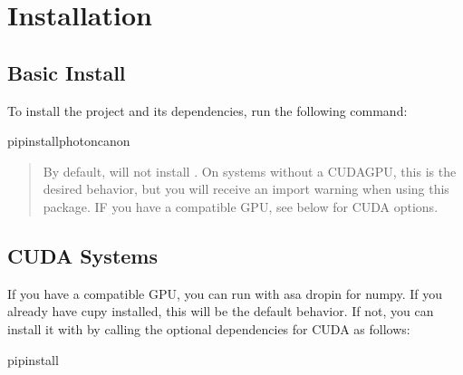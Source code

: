 \documentclass[letterpaper,10pt,english]{sphinxmanual}
\begin{document}
\section{Installation}
\label{\detokenize{README:installation}}

\subsection{Basic Install}
\label{\detokenize{README:basic-install}}
\sphinxAtStartPar
To install the project and its dependencies, run the following command:

\begin{sphinxVerbatim}[commandchars=\\\{\}]
pipinstallphoton\PYGZhy{}canon
\end{sphinxVerbatim}
\begin{quote}

\sphinxAtStartPar
{} By default,  will not install . On systems without a CUDA\sphinxhyphen{}GPU, this is the desired behavior,
but you will receive an import warning when using this package. IF you have a compatible GPU, see below for CUDA
options.
\end{quote}


\subsection{CUDA Systems}
\label{\detokenize{README:cuda-systems}}
\sphinxAtStartPar
If you have a compatible GPU, you can run  with  asa drop\sphinxhyphen{}in for numpy. If you already have cupy
installed, this will be the default behavior. If not, you can install it with  by calling the optional
dependencies for CUDA as follows:

\begin{sphinxVerbatim}[commandchars=\\\{\}]
pipinstall
\end{sphinxVerbatim}
\end{document}
